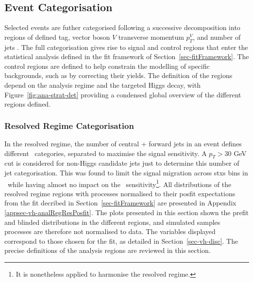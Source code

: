 \clearpage 
\subsection{Event Categorisation}\label{sec-eventCat}
Selected events are futher categorised following a successive decomposition into regions of defined tag, vector boson $V$ transverse momentum $p_T^V$, and number of jets \nj. The full categorisation gives rise to signal and control regions that enter the statistical analysis defined in the fit framework of Section~\ref{sec-fitFramework}. The control regions are defined to help constrain the modelling of specific backgrounds, such as by correcting their yields. The definition of the regions depend on the analysis regime and the targeted Higgs decay, with Figure~\ref{fig:ana-strat-det} providing a condensed global overview of the different regions defined.

\subsubsection{Resolved Regime Categorisation}
In the resolved regime, the number of central + forward jets in an event defines different \nj\ categories, separated to maximise the signal sensitivity. A $p_T > 30$ GeV cut is considered for non-Higgs candidate jets just to determine this number of jet categorisation. This was found to limit the signal migration across \gls{stxs} bins in \vhb\ while having almost no impact on the \vhc\ sensitivity\footnote{It is nonetheless applied to harmonise the resolved regime.}. All distributions of the resolved regime regions with processes normalised to their posfit expectations from the fit decribed in Section~\ref{sec-fitFramework} are presented in Appendix \ref{appsec-vh-analRegResPosfit}. The plots presented in this section shown the prefit and blinded distributions in the different regions, and simulated samples processes are therefore not normalised to data. The variables displayed correspond to those chosen for the fit, as detailed in Section~\ref{sec-vh-disc}. The precise definitions of the analysis regions are reviewed in this section.

